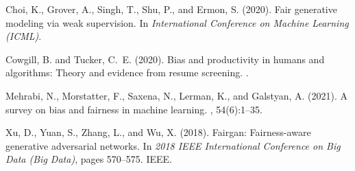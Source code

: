 \documentclass[12pt]{article}
\begin{document}

\begin{thebibliography}{}

Choi, K., Grover, A., Singh, T., Shu, P., and Ermon, S. (2020).
\newblock Fair generative modeling via weak supervision.
\newblock In {\em International Conference on Machine Learning (ICML)}.

Cowgill, B. and Tucker, C.~E. (2020).
\newblock Bias and productivity in humans and algorithms: Theory and evidence from resume screening.
.

Mehrabi, N., Morstatter, F., Saxena, N., Lerman, K., and Galstyan, A. (2021).
\newblock A survey on bias and fairness in machine learning.
, 54(6):1--35.

Xu, D., Yuan, S., Zhang, L., and Wu, X. (2018).
\newblock Fairgan: Fairness-aware generative adversarial networks.
\newblock In {\em 2018 IEEE International Conference on Big Data (Big Data)}, pages 570--575. IEEE.

\end{thebibliography}
\end{document}
